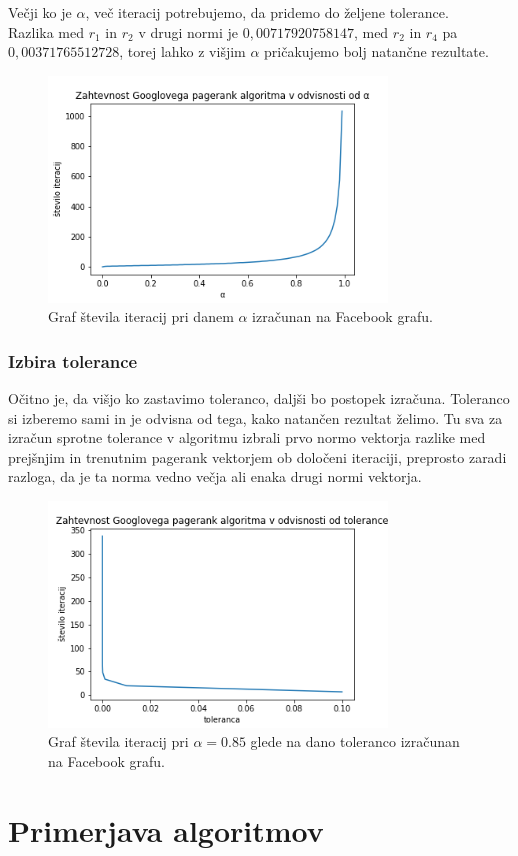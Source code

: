 \documentclass[a4paper]{article}
\begin{document}
Večji ko je $\alpha$, več iteracij potrebujemo, da pridemo do željene tolerance. \\
Razlika med $r_1$ in $r_2$ v drugi normi je $0,00717920758147$, med $r_2$ in $r_4$ pa $0,00371765512728$, torej lahko z višjim $\alpha$ pričakujemo bolj natančne rezultate.  
\begin{figure}[h]
\begin{center} 
\includegraphics[width=9cm]{Pagerank_alpha.png}
\caption[Zahtevnost Googlovega pagerank algoritma glede na $\alpha$]{Graf števila iteracij pri danem $\alpha$ izračunan na Facebook grafu.}
\end{center}
\end{figure}

\newpage

\subsubsection{Izbira tolerance} 
\hspace{4.8mm}Očitno je, da višjo ko zastavimo toleranco, daljši bo postopek izračuna. Toleranco si izberemo sami in je odvisna od tega, kako natančen rezultat želimo. Tu sva za izračun sprotne tolerance v algoritmu izbrali prvo normo vektorja razlike med prejšnjim in trenutnim pagerank vektorjem ob določeni iteraciji, preprosto zaradi razloga, da je ta norma vedno večja ali enaka drugi normi vektorja. \\
\begin{figure}[h]
\begin{center} 
\includegraphics[width=9cm]{Pagerank_tolerance.png}
	\caption[Zahtevnost Googlovega pagerank algoritma glede na toleranco]{Graf števila iteracij pri $\alpha = 0.85$ glede na dano toleranco izračunan na Facebook grafu.}
\end{center}
\end{figure}





\section{Primerjava algoritmov}
\end{document}
